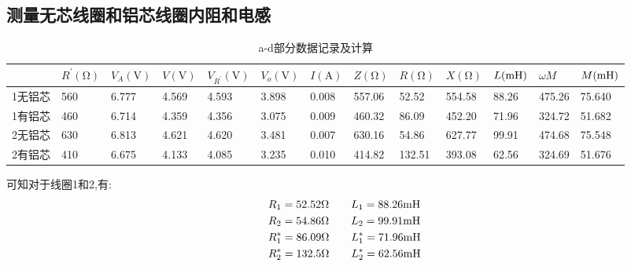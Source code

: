 \documentclass[UTF8,a4paper]{article}%
\begin{document}
\subsection{测量无芯线圈和铝芯线圈内阻和电感}
\begin{table}[H]
    \centering
    \caption{a-d部分数据记录及计算}
    \label{tb:a-d}
    \begin{tabular}{l|llllllllllll}
        \hline
             & $R^\prime(\unit{\ohm})$ & $V_A(\unit{\volt})$ & $V(\unit{\volt})$ & $V_{R^\prime}(\unit{\volt})$ & $V_o(\unit{\volt})$ & $I(\unit{\A})$ & $Z(\unit{\ohm})$ & $R(\unit{\ohm})$ & $X(\unit{\ohm})$ & $L(\unit{\mH})$ & $\omega M  $ & $M(\unit{\mH})$ \\
        \hline
        1无铝芯 & 560                     & 6.777               & 4.569             & 4.593                        & 3.898               & 0.008          & 557.06           & 52.52            & 554.58           & 88.26           & 475.26       & 75.640          \\
        1有铝芯 & 460                     & 6.714               & 4.359             & 4.356                        & 3.075               & 0.009          & 460.32           & 86.09            & 452.20           & 71.96           & 324.72       & 51.682          \\
        2无铝芯 & 630                     & 6.813               & 4.621             & 4.620                        & 3.481               & 0.007          & 630.16           & 54.86            & 627.77           & 99.91           & 474.68       & 75.548          \\
        2有铝芯 & 410                     & 6.675               & 4.133             & 4.085                        & 3.235               & 0.010          & 414.82           & 132.51           & 393.08           & 62.56           & 324.69       & 51.676          \\
        \hline
    \end{tabular}
\end{table}
可知对于线圈1和2,有:
\begin{align*}
     & R_1=52.52\unit{\ohm}\qq{}L_1=88.26\unit{\mH}     \\
     & R_2=54.86\unit{\ohm}\qq{}L_2=99.91\unit{\mH}     \\
     & R_1^*=86.09\unit{\ohm}\qq{}L_1^*=71.96\unit{\mH} \\
     & R_2^*=132.5\unit{\ohm}\qq{}L_2^*=62.56\unit{\mH}
\end{align*}
\end{document}
